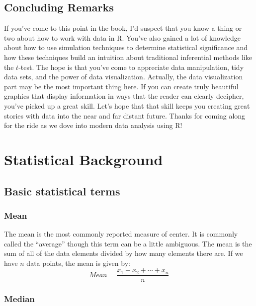 \documentclass[]{tufte-book}
\begin{document}
\section*{Concluding Remarks}\label{concluding-remarks}

If you've come to this point in the book, I'd suspect that you know a
thing or two about how to work with data in R. You've also gained a lot
of knowledge about how to use simulation techniques to determine
statistical significance and how these techniques build an intuition
about traditional inferential methods like the \(t\)-test. The hope is
that you've come to appreciate data manipulation, tidy data sets, and
the power of data visualization. Actually, the data visualization part
may be the most important thing here. If you can create truly beautiful
graphics that display information in ways that the reader can clearly
decipher, you've picked up a great skill. Let's hope that that skill
keeps you creating great stories with data into the near and far distant
future. Thanks for coming along for the ride as we dove into modern data
analysis using R!

\appendix


\chapter{Statistical Background}\label{appendixA}

\section{Basic statistical terms}\label{basic-statistical-terms}

\subsection{Mean}\label{mean}

The mean is the most commonly reported measure of center. It is commonly
called the ``average'' though this term can be a little ambiguous. The
mean is the sum of all of the data elements divided by how many elements
there are. If we have \(n\) data points, the mean is given by:
\[Mean = \frac{x_1 + x_2 + \cdots + x_n}{n}\]

\subsection{Median}\label{median}
\end{document}
